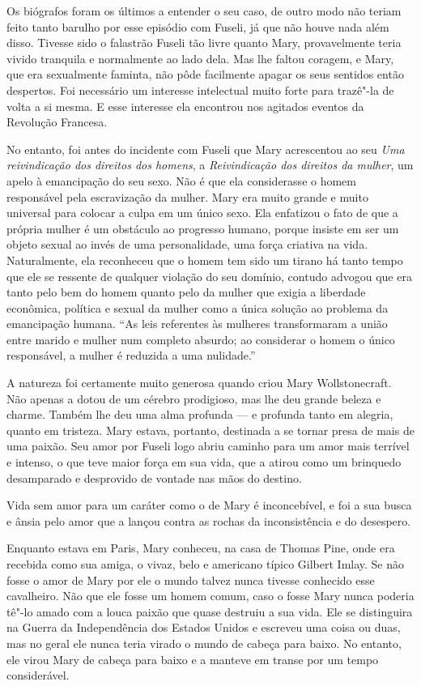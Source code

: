 Os biógrafos foram os últimos a entender o seu caso, de outro modo não
teriam feito tanto barulho por esse episódio com Fuseli, já que não
houve nada além disso. Tivesse sido o falastrão Fuseli tão livre quanto
Mary, provavelmente teria vivido tranquila e normalmente ao lado dela.
Mas lhe faltou coragem, e Mary, que era sexualmente faminta, não pôde
facilmente apagar os seus sentidos então despertos. Foi necessário um
interesse intelectual muito forte para trazê"-la de volta a si mesma. E
esse interesse ela encontrou nos agitados eventos da Revolução Francesa.

No entanto, foi antes do incidente com Fuseli que Mary acrescentou ao
seu \emph{Uma reivindicação dos direitos dos homens}, a
\emph{Reivindicação dos direitos da mulher}, um apelo à emancipação do
seu sexo. Não é que ela considerasse o homem responsável pela
escravização da mulher. Mary era muito grande e muito universal para
colocar a culpa em um único sexo. Ela enfatizou o fato de que a própria
mulher é um obstáculo ao progresso humano, porque insiste em ser um
objeto sexual ao invés de uma personalidade, uma força criativa na vida.
Naturalmente, ela reconheceu que o homem tem sido um tirano há tanto
tempo que ele se ressente de qualquer violação do seu domínio, contudo
advogou que era tanto pelo bem do homem quanto pelo da mulher que exigia
a liberdade econômica, política e sexual da mulher como a única solução
ao problema da emancipação humana. ``As leis referentes às mulheres
transformaram a união entre marido e mulher num completo absurdo; ao considerar o homem 
o único responsável, a mulher é reduzida a uma nulidade.''

A natureza foi certamente muito generosa quando criou Mary
Wollstonecraft. Não apenas a dotou de um cérebro prodigioso, mas lhe deu
grande beleza e charme. Também lhe deu uma alma profunda --- e profunda
tanto em alegria, quanto em tristeza. Mary estava, portanto, destinada a
se tornar presa de mais de uma paixão. Seu amor por Fuseli logo abriu
caminho para um amor mais terrível e intenso, o que teve maior força em
sua vida, que a atirou como um brinquedo desamparado e desprovido de
vontade nas mãos do destino.

Vida sem amor para um caráter como o de Mary é inconcebível, e foi a sua
busca e ânsia pelo amor que a lançou contra as rochas da inconsistência
e do desespero.

Enquanto estava em Paris, Mary conheceu, na casa de Thomas Pine, onde
era recebida como sua amiga, o vivaz, belo e americano típico
Gilbert Imlay. Se não fosse o amor de Mary por ele o mundo talvez
nunca tivesse conhecido esse cavalheiro. Não que ele fosse um homem
comum, caso o fosse Mary nunca poderia tê"-lo amado com a louca paixão
que quase destruiu a sua vida. Ele se distinguira na Guerra da
Independência dos Estados Unidos e escreveu uma coisa ou duas, mas no
geral ele nunca teria virado o mundo de cabeça para baixo. No entanto,
ele virou Mary de cabeça para baixo e a manteve em transe por um tempo
considerável.

